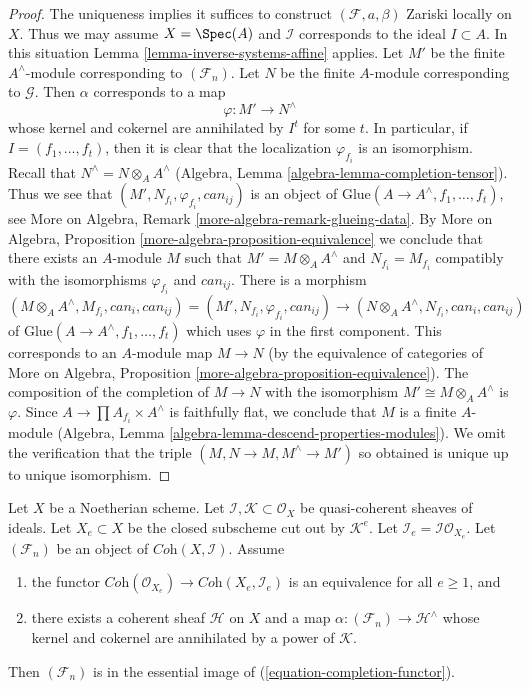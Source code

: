 \begin{proof}
The uniqueness implies it suffices to construct $(\mathcal{F}, a, \beta)$
Zariski locally on $X$. Thus we may assume $X = \Spec(A)$ and $\mathcal{I}$
corresponds to the ideal $I \subset A$. In this situation
Lemma \ref{lemma-inverse-systems-affine} applies.
Let $M'$ be the finite $A^\wedge$-module corresponding
to $(\mathcal{F}_n)$. Let $N$ be the finite $A$-module corresponding to
$\mathcal{G}$. Then $\alpha$ corresponds to a map
$$
\varphi : M' \longrightarrow N^\wedge
$$
whose kernel and cokernel are annihilated by $I^t$ for some $t$.
In particular, if $I = (f_1, \ldots, f_t)$, then it is clear that
the localization $\varphi_{f_i}$ is an isomorphism. Recall that
$N^\wedge = N \otimes_A A^\wedge$
(Algebra, Lemma \ref{algebra-lemma-completion-tensor}).
Thus we see that $(M', N_{f_i}, \varphi_{f_i}, can_{ij})$ is an
object of $\text{Glue}(A \to A^\wedge, f_1, \ldots, f_t)$, see
More on Algebra, Remark \ref{more-algebra-remark-glueing-data}.
By More on Algebra, Proposition \ref{more-algebra-proposition-equivalence}
we conclude that there exists an $A$-module $M$ such that
$M' = M \otimes_A A^\wedge$ and $N_{f_i} = M_{f_i}$ compatibly
with the isomorphisms $\varphi_{f_i}$ and $can_{ij}$. There is a
morphism
$$
(M \otimes_A A^\wedge, M_{f_i}, can_i, can_{ij}) =
(M', N_{f_i}, \varphi_{f_i}, can_{ij})
\to
(N \otimes_A A^\wedge, N_{f_i}, can_i, can_{ij})
$$
of $\text{Glue}(A \to A^\wedge, f_1, \ldots, f_t)$
which uses $\varphi$ in the first component. This
corresponds to an $A$-module map $M \to N$ (by the equivalence of
categories of
More on Algebra, Proposition \ref{more-algebra-proposition-equivalence}).
The composition of the completion of $M \to N$ with the
isomorphism $M' \cong M \otimes_A A^\wedge$ is $\varphi$.
Since $A \to \prod A_{f_i} \times A^\wedge$ is faithfully flat,
we conclude that $M$ is a finite $A$-module
(Algebra, Lemma \ref{algebra-lemma-descend-properties-modules}).
We omit the verification
that the triple $(M, N \to M, M^\wedge \to M')$ so obtained
is unique up to unique isomorphism.
\end{proof}

\begin{lemma}
\label{lemma-existence-tricky}
Let $X$ be a Noetherian scheme. Let
$\mathcal{I}, \mathcal{K} \subset \mathcal{O}_X$
be quasi-coherent sheaves of ideals.
Let $X_e \subset X$ be the closed subscheme cut out by $\mathcal{K}^e$.
Let $\mathcal{I}_e = \mathcal{I}\mathcal{O}_{X_e}$.
Let $(\mathcal{F}_n)$ be an object of $\textit{Coh}(X, \mathcal{I})$.
Assume
\begin{enumerate}
\item the functor
$\textit{Coh}(\mathcal{O}_{X_e}) \to \textit{Coh}(X_e, \mathcal{I}_e)$
is an equivalence for all $e \geq 1$, and
\item there exists a coherent sheaf $\mathcal{H}$ on $X$ and a map
$\alpha : (\mathcal{F}_n) \to \mathcal{H}^\wedge$ whose
kernel and cokernel are annihilated by a power of $\mathcal{K}$.
\end{enumerate}
Then $(\mathcal{F}_n)$ is in the essential image of
(\ref{equation-completion-functor}).
\end{lemma}

